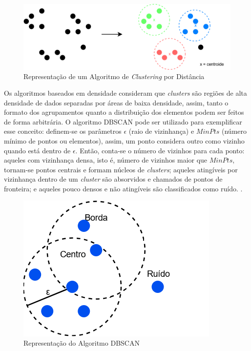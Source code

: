 \begin{figure}[H]
	\caption{\label{fig:kmeans}Representação de um Algoritmo de \textit{Clustering} por Distância}
    \begin{center}
    \includegraphics[width=1\linewidth]{images/kmeans.png}
	\end{center}
\end{figure}

Os algoritmos baseados em densidade consideram que \textit{clusters} são regiões de alta densidade de dados separadas por áreas de baixa densidade, assim, tanto o formato dos agrupamentos quanto a distribuição dos elementos podem ser feitos de forma arbitrária. O algoritmo DBSCAN pode ser utilizado para exemplificar esse conceito: definem-se os parâmetros $\epsilon$ (raio de vizinhança) e $MinPts$ (número mínimo de pontos ou elementos), assim, um ponto considera outro como vizinho quando está dentro de $\epsilon$. Então, conta-se o número de vizinhos para cada ponto: aqueles com vizinhança densa, isto é, número de vizinhos maior que $MinPts$, tornam-se pontos centrais e formam núcleos de \textit{clusters}; aqueles atingíveis por vizinhança dentro de um \textit{cluster} são absorvidos e chamados de pontos de fronteira; e aqueles pouco densos e não atingíveis são classificados como ruído. \cite{cluster1}.

\begin{figure}[H]
	\caption{\label{fig:dbscan}Representação do Algoritmo DBSCAN}
    \begin{center}
    \includegraphics[width=.5\linewidth]{images/dbscan.png}
	\end{center}
\end{figure}


